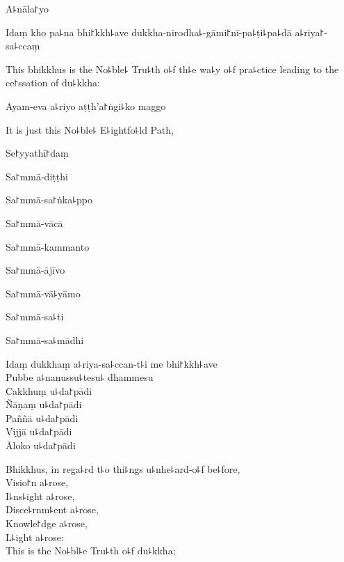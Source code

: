 A꜕nāla꜓yo


Idaṃ kho pa꜕na bhi꜓kkh꜕ave dukkha-nirodha꜕-gāmi꜓nī-pa꜕ṭi꜕pa꜕dā a꜕riya꜓-sa꜕ccaṃ

\begin{english}
  This bhikkhus is the No꜕ble꜕ Tru꜕th o꜕f th꜕e wa꜕y o꜕f pra꜕ctice leading to the ce꜓ssation of du꜕kkha:
\end{english}

Ayam-eva a꜕riyo aṭṭh'a꜓ṅgi꜕ko maggo

\begin{english}
  It is just this No꜕ble꜕ E꜕ightfo꜕ld Path,
\end{english}

Se꜓yyathī꜓daṃ


Sa꜓mmā-diṭṭhi


Sa꜓mmā-sa꜓ṅka꜕ppo


Sa꜓mmā-vācā


Sa꜓mmā-kammanto


Sa꜓mmā-ājīvo


Sa꜓mmā-vā꜕yāmo


Sa꜓mmā-sa꜕ti


Sa꜓mmā-sa꜕mādhi


Idaṃ dukkhaṃ a꜕riya-sa꜕ccan-t꜕i me bhi꜓kkh꜕ave\\
Pubbe a꜕nanussu꜕tesu꜕ dhammesu\\
Cakkhuṃ u꜕da꜓pādi\\
Ñāṇaṃ u꜕da꜓pādi\\
Paññā u꜕da꜓pādi\\
Vijjā u꜕da꜓pādi\\
Āloko u꜕da꜓pādi

\begin{english}
  Bhikkhus, in rega꜕rd t꜕o thi꜕ngs u꜕nhe꜕ard-o꜕f be꜕fore,\\
  Visio꜓n a꜕rose,\\
  I꜕ns꜕ight a꜕rose,\\
  Disce꜕rnm꜕ent a꜕rose,\\
  Knowle꜓dge a꜕rose,\\
  L꜕ight a꜕rose:\\
  This is the No꜕bl꜕e Tru꜕th o꜕f du꜕kkha;
\end{english}

